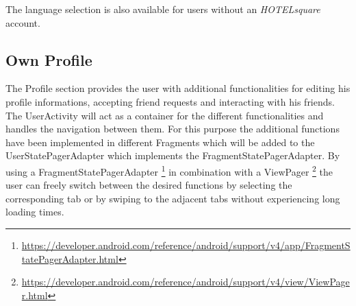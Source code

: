 The language selection is also available for users without an \textit{HOTELsquare} account.

\subsection{Own Profile}
The Profile section provides the user with additional functionalities for editing his profile informations, accepting friend requests and interacting with his friends. The UserActivity will act as a container for the different functionalities and handles the navigation between them. For this purpose the additional functions have been implemented in different Fragments which will be added to the UserStatePagerAdapter which implements the FragmentStatePagerAdapter. By using a FragmentStatePagerAdapter \footnote{\url{https://developer.android.com/reference/android/support/v4/app/FragmentStatePagerAdapter.html}} in combination with a ViewPager \footnote{\url{https://developer.android.com/reference/android/support/v4/view/ViewPager.html}} the user can freely switch between the desired functions by selecting the corresponding tab or by swiping to the adjacent tabs without experiencing long loading times.







